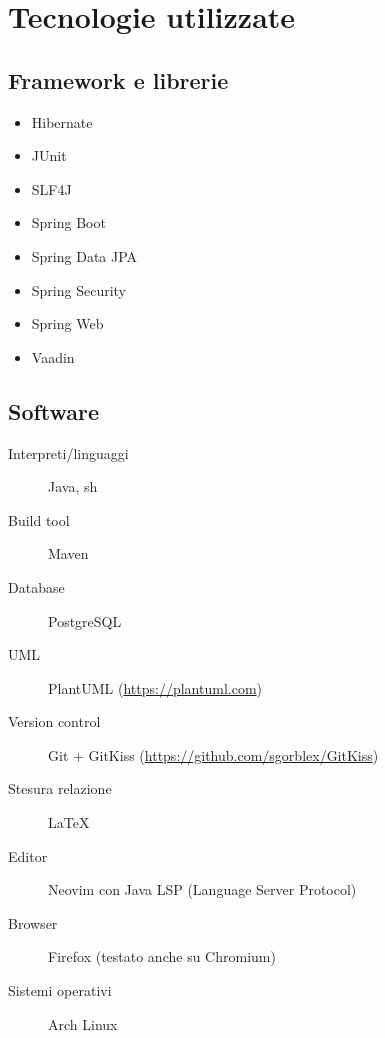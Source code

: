 \section{Tecnologie utilizzate}


\subsection{Framework e librerie}
\begin{itemize}
	\item Hibernate
	\item JUnit
	\item SLF4J
	\item Spring Boot
	\item Spring Data JPA
	\item Spring Security
	\item Spring Web
	\item Vaadin
\end{itemize}


\subsection{Software}
\begin{description}
	\item[Interpreti/linguaggi] Java, sh
	\item[Build tool] Maven
	\item[Database] PostgreSQL
	\item[UML] PlantUML (\url{https://plantuml.com})
	\item[Version control] Git + GitKiss (\url{https://github.com/sgorblex/GitKiss})
	\item[Stesura relazione] \LaTeX
	\item[Editor] Neovim con Java LSP (Language Server Protocol)
	\item[Browser] Firefox (testato anche su Chromium)
	\item[Sistemi operativi] Arch Linux
\end{description}
